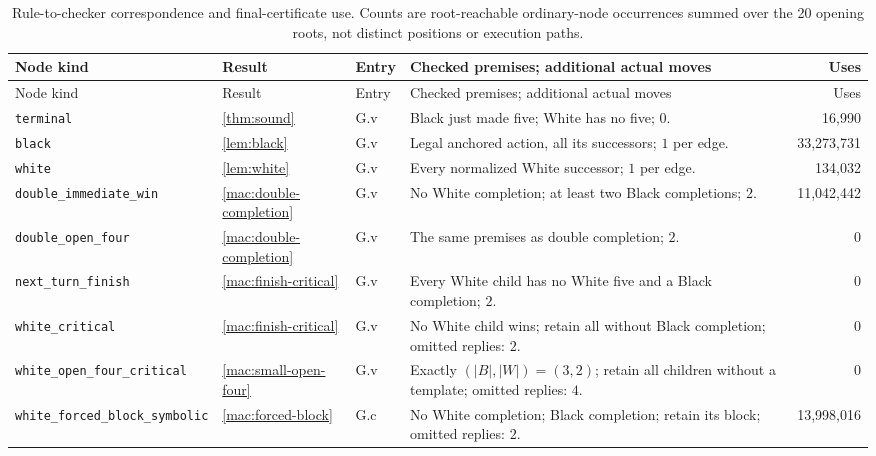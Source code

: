 \documentclass[11pt]{article}
\theoremstyle{definition}
\theoremstyle{remark}
\begin{document}
\begingroup\scriptsize\setlength{\tabcolsep}{2pt}\renewcommand{\arraystretch}{1.12}
\begin{longtable}{@{}>{\raggedright\arraybackslash}p{.25\linewidth}>{\raggedright\arraybackslash}p{.07\linewidth}>{\raggedright\arraybackslash}p{.09\linewidth}>{\raggedright\arraybackslash}p{.39\linewidth}r@{}}
\caption{Rule-to-checker correspondence and final-certificate use. Counts are
root-reachable ordinary-node occurrences summed over the 20 opening roots,
not distinct positions or execution paths.}\label{tab:rule-use}\\
\toprule
Node kind & Result & Entry & Checked premises; additional actual moves & Uses\\
\midrule
\endfirsthead
\toprule
Node kind & Result & Entry & Checked premises; additional actual moves & Uses\\
\midrule
\endhead
\texttt{terminal} & \ref{thm:sound} & G.v & Black just made five; White has no five; $0$. & 16,990\\
\texttt{black} & \ref{lem:black} & G.v & Legal anchored action, all its successors; $1$ per edge. & 33,273,731\\
\texttt{white} & \ref{lem:white} & G.v & Every normalized White successor; $1$ per edge. & 134,032\\
\texttt{double\_\allowbreak immediate\_\allowbreak win} & \ref{mac:double-completion} & G.v & No White completion; at least two Black completions; $2$. & 11,042,442\\
\texttt{double\_\allowbreak open\_\allowbreak four} & \ref{mac:double-completion} & G.v & The same premises as double completion; $2$. & 0\\
\texttt{next\_\allowbreak turn\_\allowbreak finish} & \ref{mac:finish-critical} & G.v & Every White child has no White five and a Black completion; $2$. & 0\\
\texttt{white\_\allowbreak critical} & \ref{mac:finish-critical} & G.v & No White child wins; retain all without Black completion; omitted replies: $2$. & 0\\
\texttt{white\_\allowbreak open\_\allowbreak four\_\allowbreak critical} & \ref{mac:small-open-four} & G.v & Exactly $(|B|,|W|)=(3,2)$; retain all children without a template; omitted replies: $4$. & 0\\
\texttt{white\_\allowbreak forced\_\allowbreak block\_\allowbreak symbolic} & \ref{mac:forced-block} & G.c & No White completion; Black completion; retain its block; omitted replies: $2$. & 13,998,016\\

\end{longtable}
\end{document}

